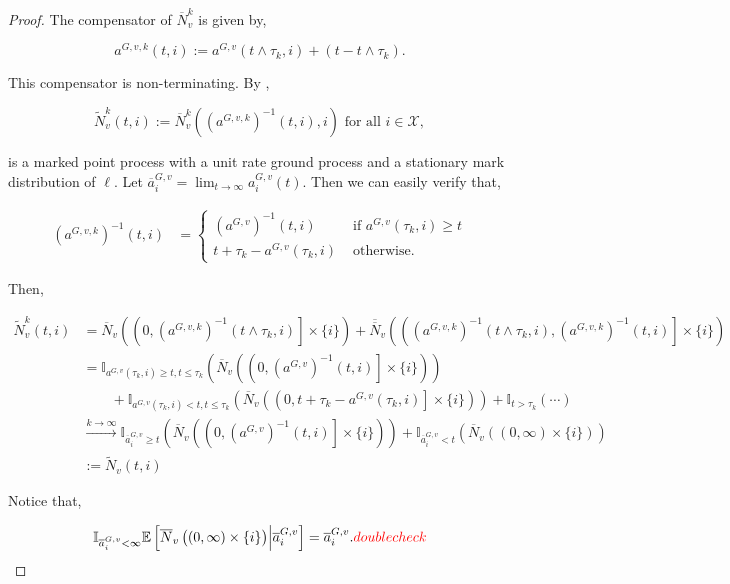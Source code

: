 \documentclass[12pt]{article}
\newcommand{\mb}{\mathbb}
\newcommand{\mc}{\mathcal}
\newcommand{\ra}{\rightarrow}
\newcommand{\ov}{\overline}
\newcommand{\os}{\overset}
\newcommand{\te}{\text}
\newcommand{\tr}{\textcolor{red}}
\newcommand{\ex}[1]{\mb{E}\left[#1\right]}			%
\newcommand{\defeq}{:=}								%
\newcommand{\sta}{\mc{X}}							%
\newcommand{\poiss}{N}								%
\newcommand{\Sm}{\ell}								%
\newcommand{\poissv}[1]{_{#1}}						%
\newcommand{\stpara}[1]{_{#1}}						%
\newcommand{\gvpara}[2]{^{#1,#2}}					%
\newcommand{\compen}{a}								%
\newcommand{\compenbd}{\ov{a}}						%
\newcommand{\binver}[1]{(#1)^{-1}}					%
\newcommand{\alt}[1]{\tilde{#1}}					%
\newcommand{\gvjpara}[3]{^{#1,#2,#3}}				%
\begin{document}
\begin{proof}
The compensator of \(\ov{\poiss}\poissv{v}^k\) is given by, 

\[\compen\gvjpara{G}{v}{k}(t,i) := \compen\gvpara{G}{v}(t\wedge \tau_k,i) + (t - t\wedge\tau_k).\]

This compensator is non-terminating. By \cite[Theorem 14.6.IV]{DalVer08}, 

\[\alt{\poiss}\poissv{v}^k(t,i) \defeq \ov{\poiss}\poissv{v}^k\left(\binver{\compen\gvjpara{G}{v}{k}}(t,i),i\right)\te{ for all }i\in \sta,\]

is a marked point process with a unit rate ground process and a stationary mark distribution of \(\Sm\). Let \(\compenbd\gvpara{G}{v}\stpara{i} = \lim_{t\ra\infty}\compen\gvpara{G}{v}\stpara{i}(t)\). Then we can easily verify that,

\begin{align*}
\binver{\compen\gvjpara{G}{v}{k}}(t,i)&= \begin{cases}
\binver{\compen\gvpara{G}{v}}(t,i) &\te{ if } \compen\gvpara{G}{v}(\tau_k,i) \geq t\\
t + \tau_k - \compen\gvpara{G}{v}(\tau_k,i) &\te{ otherwise.}
\end{cases}
\end{align*}

Then,

\begin{align*}
\alt{\poiss}\poissv{v}^k(t,i) &= \ov{\poiss}\poissv{v}\left(\left(0,\binver{\compen\gvjpara{G}{v}{k}}(t\wedge\tau_k,i)\right]\times\{i\}\right) + \ov{\ov{\poiss}}\poissv{v}\left(\left(\binver{\compen\gvjpara{G}{v}{k}}(t\wedge\tau_k,i),\binver{\compen\gvjpara{G}{v}{k}}(t,i)\right]\times\{i\}\right)\\
&=\mb{I}_{\compen\gvpara{G}{v}(\tau_k,i) \geq t, t \leq \tau_k}\left(\ov{\poiss}\poissv{v}\left(\left(0,\binver{\compen\gvpara{G}{v}}(t,i)\right]\times\{i\}\right)\right)\\
&\hspace{24pt} + \mb{I}_{\compen\gvpara{G}{v}(\tau_k,i) < t, t \leq \tau_k}\left(\ov{\poiss}\poissv{v}\left(\left(0,t + \tau_k - \compen\gvpara{G}{v}(\tau_k,i)\right]\times\{i\}\right)\right) + \mb{I}_{t > \tau_k}\left(\cdots\right)\\
&\os{k\ra\infty}{\ra} \mb{I}_{\compenbd\gvpara{G}{v}\stpara{i} \geq t}\left(\ov{\poiss}\poissv{v}\left(\left(0,\binver{\compen\gvpara{G}{v}}(t,i)\right]\times\{i\}\right)\right) + \mb{I}_{\compenbd\gvpara{G}{v}\stpara{i} < t}\left(\ov{\poiss}\poissv{v}\left(\left(0,\infty\right)\times\{i\}\right)\right)\\
&\defeq \alt{\poiss}\poissv{v}(t,i)
\end{align*}

Notice that,

\[\mb{I}_{\compenbd\gvpara{G}{v}\stpara{i}< \infty}\ex{\ov{\poiss}\poissv{v}\left(\left(0,\infty\right)\times\{i\}\right)\middle|\compenbd\gvpara{G}{v}\stpara{i}} =  \compenbd\gvpara{G}{v}\stpara{i}.\tr{ double check}\]

\end{proof}
\end{document}
